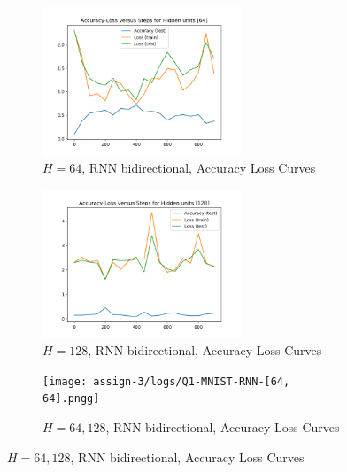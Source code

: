 \begin{figure}[!htbp]
\begin{subfigure}
\centering
\includegraphics[angle=0,width=0.65\textwidth]{assign-3/logs/Q1-MNIST-RNN-[64].png}
\caption{$H=64$, RNN bidirectional, Accuracy Loss Curves}
\end{subfigure}
\begin{subfigure}
\centering
\includegraphics[angle=0,width=0.65\textwidth]{assign-3/logs/Q1-MNIST-RNN-[128].png}
\caption{$H=128$, RNN bidirectional, Accuracy Loss Curves}
\end{subfigure}
\begin{subfigure}
\centering
\texttt{[image: assign-3/logs/Q1-MNIST-RNN-[64, 64].pngg]}
\caption{$H=64, 128$, RNN bidirectional, Accuracy Loss Curves}
\end{subfigure}
\end{figure}

